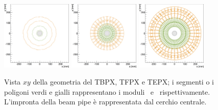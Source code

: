 \begin{figure}
\centering
\includegraphics[width=0.3\textwidth]{Immagini/ITxyTBPX_scaled}
\hfill
\includegraphics[width=0.3\textwidth]{Immagini/ITxyTFPX_scaled}
\hfill
\includegraphics[width=0.3\textwidth]{Immagini/ITxyTEPX}
\caption{Vista $xy$ della geometria del TBPX, TFPX e TEPX; i segmenti o i poligoni verdi e gialli rappresentano i moduli \modud\ e \moddd\, rispettivamente. L'impronta della beam pipe \`e rappresentata dal cerchio centrale.}
\label{fig:ITxyView}
\end{figure}


